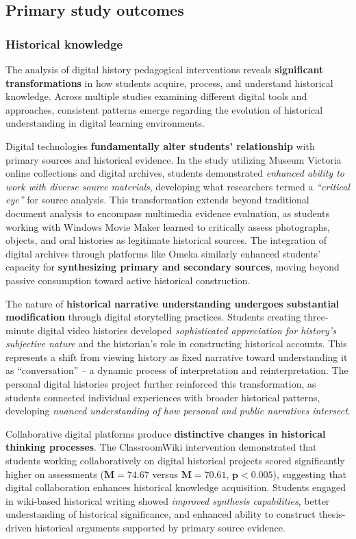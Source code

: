 \documentclass[
hf,
]{ceurart}
\begin{document}
\subsection{Primary study outcomes}
\subsubsection{Historical knowledge}
The analysis of digital history pedagogical interventions reveals \textbf{significant transformations} in how students acquire, process, and understand historical knowledge. Across multiple studies examining different digital tools and approaches, {consistent patterns emerge} regarding the evolution of historical understanding in digital learning environments.

Digital technologies \textbf{fundamentally alter students' relationship} with primary sources and historical evidence. In the study utilizing Museum Victoria online collections and digital archives, students demonstrated \textit{enhanced ability to work with diverse source materials}, developing what researchers termed a \textit{``critical eye''} for source analysis. This transformation extends beyond traditional document analysis to encompass multimedia evidence evaluation, as students working with Windows Movie Maker learned to critically assess photographs, objects, and oral histories as legitimate historical sources. The integration of digital archives through platforms like Omeka similarly enhanced students' capacity for \textbf{synthesizing primary and secondary sources}, moving beyond passive consumption toward active historical construction.

The nature of \textbf{historical narrative understanding undergoes substantial modification} through digital storytelling practices. Students creating three-minute digital video histories developed \textit{sophisticated appreciation for history's subjective nature} and the historian's role in constructing historical accounts. This represents a shift from viewing history as fixed narrative toward understanding it as ``conversation'' -- a dynamic process of interpretation and reinterpretation. The personal digital histories project further reinforced this transformation, as students connected individual experiences with broader historical patterns, developing \textit{nuanced understanding of how personal and public narratives intersect}.

Collaborative digital platforms produce \textbf{distinctive changes in historical thinking processes}. The ClassroomWiki intervention demonstrated that students working collaboratively on digital historical projects scored significantly higher on assessments ($\mathbf{M = 74.67}$ versus $\mathbf{M = 70.61}$, $\mathbf{p < 0.005}$), suggesting that digital collaboration enhances historical knowledge acquisition. Students engaged in wiki-based historical writing showed \textit{improved synthesis capabilities}, better understanding of historical significance, and enhanced ability to construct thesis-driven historical arguments supported by primary source evidence.
\end{document}
